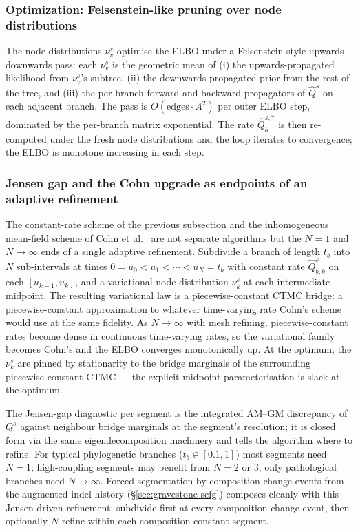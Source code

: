 \subsubsection*{Optimization: Felsenstein-like pruning over node distributions}

The node distributions $\nu_v^s$ optimise the ELBO under a
Felsenstein-style upwards--downwards pass: each $\nu_v^s$ is the
geometric mean of (i) the upwards-propagated likelihood from
$\nu_v^s$'s subtree, (ii) the downwards-propagated prior from the
rest of the tree, and (iii) the per-branch forward and backward
propagators of $\hat Q^s$ on each adjacent branch. The pass is
$O(\text{edges} \cdot A^2)$ per outer ELBO step, dominated by the
per-branch matrix exponential. The rate $\hat Q^{s, *}_b$ is then
re-computed under the fresh node distributions and the loop iterates
to convergence; the ELBO is monotone increasing in each step.

\subsubsection*{Jensen gap and the Cohn upgrade as endpoints of an
adaptive refinement}

The constant-rate scheme of the previous subsection and the
inhomogeneous mean-field scheme of Cohn et al.~\citep{cohn2010} are
not separate algorithms but the $N = 1$ and $N \to \infty$ ends of a
single adaptive refinement. Subdivide a branch of length $t_b$ into
$N$ sub-intervals at times $0 = u_0 < u_1 < \cdots < u_N = t_b$ with
constant rate $\hat Q^s_{b, k}$ on each $[u_{k-1}, u_k]$, and a
variational node distribution $\nu^s_k$ at each intermediate
midpoint. The resulting variational law is a piecewise-constant CTMC
bridge: a piecewise-constant approximation to whatever time-varying
rate Cohn's scheme would use at the same fidelity. As $N \to \infty$
with mesh refining, piecewise-constant rates become dense in
continuous time-varying rates, so the variational family becomes
Cohn's and the ELBO converges monotonically up. At the optimum, the
$\nu^s_k$ are pinned by stationarity to the bridge marginals of the
surrounding piecewise-constant CTMC --- the explicit-midpoint
parameterisation is slack at the optimum.

The Jensen-gap diagnostic per segment is the integrated AM--GM
discrepancy of $Q^s$ against neighbour bridge marginals at the
segment's resolution; it is closed form via the same eigendecomposition
machinery and tells the algorithm where to refine. For typical
phylogenetic branches ($t_b \in [0.1, 1]$) most segments need
$N = 1$; high-coupling segments may benefit from $N = 2$ or $3$;
only pathological branches need $N \to \infty$.
Forced segmentation by composition-change events from the augmented
indel history (\S\ref{sec:gravestone-scfg}) composes cleanly with
this Jensen-driven refinement: subdivide first at every
composition-change event, then optionally $N$-refine within each
composition-constant segment.

